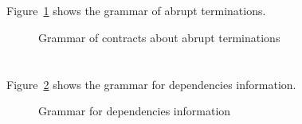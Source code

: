 \section{}
\label{sec:abrupt}

\nodiff

Figure~\ref{fig:gram:abrupt} shows the grammar of abrupt terminations.

\begin{figure}[htbp]
  \begin{cadre}
    
  \end{cadre}
  \caption{Grammar of contracts about abrupt terminations}
  \label{fig:gram:abrupt}
\end{figure}


\section{}
\label{sec:func-dep}
\experimental

\nodiff

Figure~\ref{fig:gram:dep} shows the grammar for dependencies information.

\begin{figure}[htp]
  \begin{cadre}
      
    \end{cadre}
  \caption{Grammar for dependencies information}
\label{fig:gram:dep}
\end{figure}


\section{}
\label{sec:invariants}

